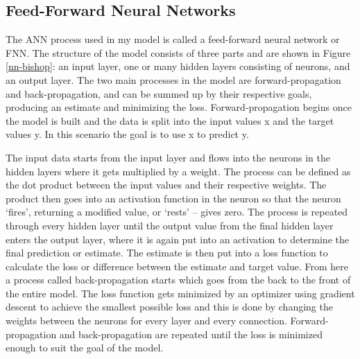 \documentclass[12pt]{article}
\begin{document}
        \subsection{Feed-Forward Neural Networks}

            The ANN process used in my model is called a feed-forward neural network or FNN. 
            The structure of the model consists of three parts and are shown in Figure \ref{nn-bishop}: 
            an input layer, one or many hidden layers consisting of neurons, and an output layer. 
            The two main processes in the model are forward-propagation and back-propagation, 
            and can be summed up by their respective goals, producing an estimate and minimizing the loss. 
            Forward-propagation begins once the model is built and the data is split into the input values x and the target values y. 
            In this scenario the goal is to use x to predict y.  

            The input data starts from the input layer and flows into the neurons in the hidden layers where it gets multiplied by a weight. 
            The process can be defined as the dot product between the input values and their respective weights. 
            The product then goes into an activation function in the neuron 
            so that the neuron ‘fires’, returning a modified value, or ‘rests’ -- gives zero. 
            The process is repeated through every hidden layer until the output value from the final hidden layer enters the output layer, 
            where it is again put into an activation to determine the final prediction or estimate. 
            The estimate is then put into a loss function to calculate the loss or difference between the estimate and target value. 
            From here a process called back-propagation starts which goes from the back to the front of the entire model. 
            The loss function gets minimized by an optimizer using gradient descent to achieve the smallest possible loss 
            and this is done by changing the weights between the neurons for every layer and every connection. 
            Forward-propagation and back-propagation are repeated until the loss is minimized enough to suit the goal of the model.
        
\end{document}
